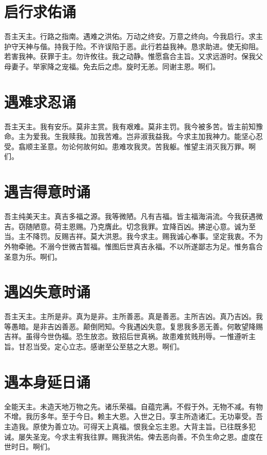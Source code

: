 \documentclass[UTF8,17pt]{ctexart}
\begin{document}
\section{启⾏求佑诵}

吾主天主。⾏路之指南。遇难之洪佑。万动之终安。万意之终向。今我启⾏。求主护守天神与偕。持我于险。不许误陷于恶。此⾏若益我神。恳求助进。使⽆抑阻。若害我神。获罪于主。勿许攸往。我之动静。惟愿翕合主旨。又求远游时。保我⽗母妻⼦。举家降之宠福。免去后之虑。旋时⽆恙。同谢主恩。啊们。

\section{遇难求忍诵}

吾主天主。我有安乐。莫⾮主赏。我有艰难。莫⾮主罚。我今被多苦。皆主前知豫命。主为爱我。⽣我赎我。加我苦难。岂⾮淑我益我。今求主加我神⼒。能坚⼼忍受。翕顺主圣意。勿论何故何如。患难攻我灵。苦我躯。惟望主消灭我万罪。啊们。

\section{遇吉得意时诵}

吾主纯美天主。真吉多福之源。我等微陋。凡有吉福。皆主福海涓流。今我获遇微吉。窃随陋意。荷主恩赐。乃克膺此。切念我罪。宜降百凶。拂逆⼼意。诚为⾄当。主不降罚。反赐吉祥。莫⼤洪恩。我今求主。赐我诚⼼奉事。坚定我衷。不为外物牵驰。不溺今世微吉暂福。惟图后世真吉永福。不以所遂鄙志为⾜。惟务翕合圣意为乐。啊们。

\section{遇凶失意时诵}

吾主天主。主所是⾮。真为是⾮。主所善恶。真是善恶。主所吉凶。真乃吉凶。我等愚暗。是⾮吉凶善恶。颠倒罔知。今我遇凶失意。复思我多恶⽆善。何敢望降赐吉祥。虽得今世伪福。恐⽣放恣。致招后世真祸。故患难贫贱刑辱。⼀惟遵听主旨。⽢忍当受。定⼼⽴志。感谢⾄公⾄慈之⼤恩。啊们。

\section{遇本⾝延⽇诵}

全能天主。未造天地万物之先。诸乐荣福。⾃蕴完满。不假于外。⽆物不减。有物不增。我历多年。⾄于今⽇。赖主⼤恩。⼊世之⽇。享主所造诸汇。⽆功辜受。吾主造我。原使为善⽴功。可得天上真福。恨我全忘主恩。⼤背主旨。已往既多犯诫。屡失圣宠。今求主宥我往罪。赐我洪佑。俾去恶向善。不负⽣命之恩。虚度在世时⽇。啊们。
\end{document}
